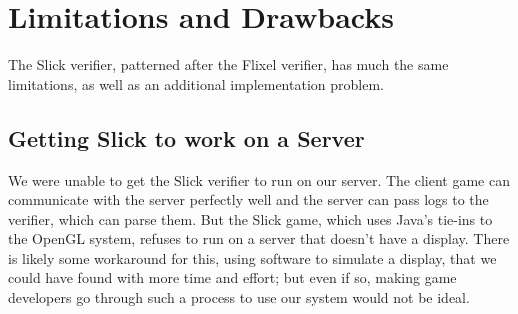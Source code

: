 \documentclass [11pt, twocolumn] {article}
\begin{document}
\section { Limitations and Drawbacks }
\label{sec:limitations}

The Slick verifier, patterned after the Flixel verifier, has much the same limitations, as well as an additional implementation problem.

\subsection { Getting Slick to work on a Server }

We were unable to get the Slick verifier to run on our server.  The client game can communicate with the server perfectly well and the server can pass logs to the verifier, which can parse them.  But the Slick game, which uses Java's tie-ins to the OpenGL system, refuses to run on a server that doesn't have a display.
There is likely some workaround for this, using software to simulate a display, that we could have found with more time and effort; but even if so, making game developers go through such a process to use our system would not be ideal.
\end{document}
